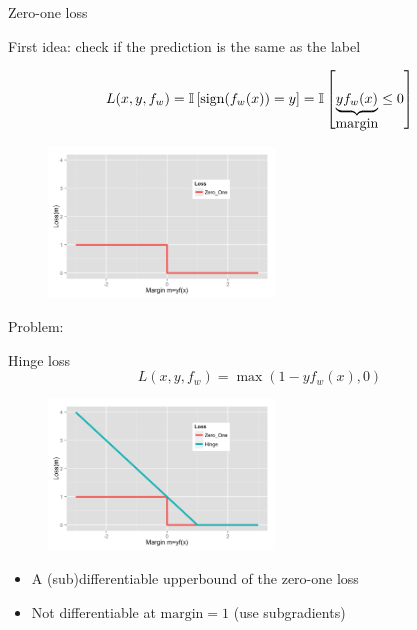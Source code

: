 \documentclass[usenames,dvipsnames,notes,11pt,aspectratio=169]{beamer}
\begin{document}
\begin{frame}
    {Zero-one loss}
    
    First idea: check if the prediction is the same as the label

            \begin{align}
                L(x, y, f_w) = \mathbb{I}\left[ \text{sign}(f_w(x)) = y \right] 
                = \mathbb{I}\left[ \underbrace{yf_w(x)}_{\textstyle\text{margin}}\le 0 \right]
            \end{align}
    \begin{figure}
        \includegraphics[height=4cm]{figures/loss.Zero_One.png}
    \end{figure}
    \pause
    Problem: 
\end{frame}

\begin{frame}
    {Hinge loss}
    $$
    L(x,y,f_w) = \max(1-yf_w(x), 0)
    $$
    \begin{figure}
        \includegraphics[height=4cm]{figures/loss.Zero_One.Hinge.png}
    \end{figure}
    \begin{itemize}
        \item A (sub)differentiable upperbound of the zero-one loss
        \item Not differentiable at $\text{margin}=1$ (use subgradients)
    \end{itemize}
\end{frame}
\end{document}
